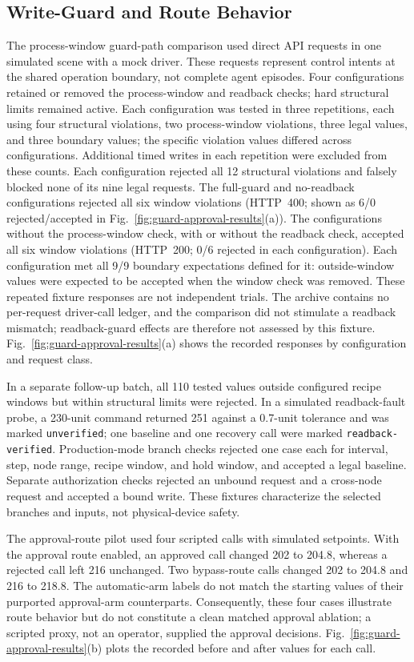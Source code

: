 \documentclass[journal]{IEEEtran}
\begin{document}
\subsection{Write-Guard and Route Behavior}
\label{sec:eval-ablation}
The process-window guard-path comparison used direct API requests in one simulated scene with a mock driver. These requests represent control intents at the shared operation boundary, not complete agent episodes. Four configurations retained or removed the process-window and readback checks; hard structural limits remained active. Each configuration was tested in three repetitions, each using four structural violations, two process-window violations, three legal values, and three boundary values; the specific violation values differed across configurations. Additional timed writes in each repetition were excluded from these counts. Each configuration rejected all 12 structural violations and falsely blocked none of its nine legal requests. The full-guard and no-readback configurations rejected all six window violations (HTTP~400; shown as 6/0 rejected/accepted in Fig.~\ref{fig:guard-approval-results}(a)). The configurations without the process-window check, with or without the readback check, accepted all six window violations (HTTP~200; 0/6 rejected in each configuration). Each configuration met all 9/9 boundary expectations defined for it: outside-window values were expected to be accepted when the window check was removed. These repeated fixture responses are not independent trials. The archive contains no per-request driver-call ledger, and the comparison did not stimulate a readback mismatch; readback-guard effects are therefore not assessed by this fixture. Fig.~\ref{fig:guard-approval-results}(a) shows the recorded responses by configuration and request class.

In a separate follow-up batch, all 110 tested values outside configured recipe windows but within structural limits were rejected. In a simulated readback-fault probe, a 230-unit command returned 251 against a 0.7-unit tolerance and was marked \texttt{unverified}; one baseline and one recovery call were marked \texttt{readback-verified}. Production-mode branch checks rejected one case each for interval, step, node range, recipe window, and hold window, and accepted a legal baseline. Separate authorization checks rejected an unbound request and a cross-node request and accepted a bound write. These fixtures characterize the selected branches and inputs, not physical-device safety.

The approval-route pilot used four scripted calls with simulated setpoints. With the approval route enabled, an approved call changed 202 to 204.8, whereas a rejected call left 216 unchanged. Two bypass-route calls changed 202 to 204.8 and 216 to 218.8. The automatic-arm labels do not match the starting values of their purported approval-arm counterparts. Consequently, these four cases illustrate route behavior but do not constitute a clean matched approval ablation; a scripted proxy, not an operator, supplied the approval decisions. Fig.~\ref{fig:guard-approval-results}(b) plots the recorded before and after values for each call.
\end{document}
